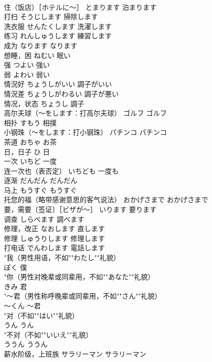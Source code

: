 \documentclass[8pt]{extreport}
\begin{document}
\begin{CJK}{UTF8}{min}
\\	住（饭店）［ホテルに～］	とまります	泊まります
\\	打扫	そうじします	掃除します
\\	洗衣服	せんたくします	洗濯します
\\	练习	れんしゅうします	練習します
\\	成为	なります	なります
\\	想睡，困	ねむい	眠い
\\	强	つよい	強い
\\	弱	よわい	弱い
\\	情況好	ちょうしがいい	調子がいい
\\	情況差	ちょうしがわるい	調子が悪い
\\	情况，状态	ちょうし	調子
\\	高尔夫球（～をします：打高尔夫球）	ゴルフ	ゴルフ
\\	相扑	すもう	相撲
\\	小钢珠（～をします：打小钢珠）	パチンコ	パチンコ
\\	茶道	おちゃ	お茶
\\	日，日子	ひ	日
\\	一次	いちど	一度
\\	连一次也（表否定）	いちども	一度も
\\	逐渐	だんだん	だんだん
\\	马上	もうすぐ	もうすぐ
\\	托您的福（略带感谢意思的客气说法）	おかげさまで	おかげさまで
\\	要，需要〔签证〕［ビザが～］	いります	要ります
\\	调查	しらべます	調べます
\\	修理，改正	なおします	直します
\\	修理	しゅうりします	修理します
\\	打电话	でんわします	電話します
\\	"我（男性用语，不如""わたし""礼貌）
\\	ぼく	僕
\\	"你（男性对晚辈或同辈用，不如""あなた""礼貌）
\\	きみ	君
\\	"～君（男性称呼晚辈或同辈用，不如""さん""礼貌）
\\	～くん	～君
\\	"对（不如""はい""礼貌）
\\	うん	うん
\\	"不对（不如""いいえ""礼貌）
\\	ううん	ううん
\\	薪水阶级，上班族	サラリーマン	サラリーマン

\end{CJK}
\end{document}
